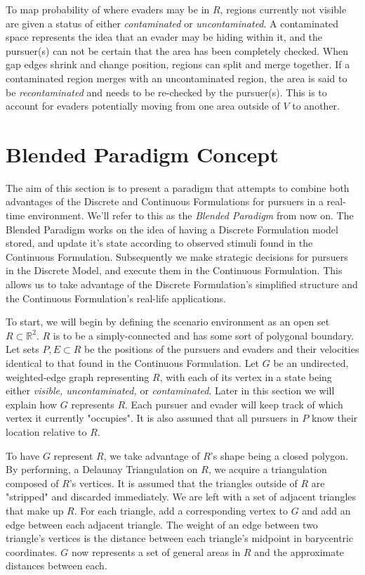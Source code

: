 \documentclass{article}
\begin{document}
To map probability of where evaders may be in \(R\), regions currently not visible are given a status of either \emph{contaminated} or \emph{uncontaminated}. A contaminated space represents the idea that an evader may be hiding within it, and the pursuer(s) can not be certain that the area has been completely checked. When gap edges shrink and change position, regions can split and merge together. If a contaminated region merges with an uncontaminated region, the area is said to be \emph{recontaminated} and needs to be re-checked by the pursuer(s). This is to account for evaders potentially moving from one area outside of \(V\) to another.

\section{Blended Paradigm Concept}
The aim of this section is to present a paradigm that attempts to combine both advantages of the Discrete and Continuous Formulations for pursuers in a real-time environment. We'll refer to this as the \emph{Blended Paradigm} from now on. The Blended Paradigm works on the idea of having a Discrete Formulation model stored, and update it's state according to observed stimuli found in the Continuous Formulation. Subsequently we make strategic decisions for pursuers in the Discrete Model, and execute them in the Continuous Formulation. This allows us to take advantage of the Discrete Formulation's simplified structure and the Continuous Formulation's real-life applications.

To start, we will begin by defining the scenario environment as an open set \(R\subset\mathbb{R}^2\). \(R\) is to be a simply-connected and has some sort of polygonal boundary. Let sets \(P,E\subset{R}\) be the positions of the pursuers and evaders and their velocities identical to that found in the Continuous Formulation. Let \(G\) be an undirected, weighted-edge graph representing \(R\), with each of its vertex in a state being either \emph{visible, uncontaminated,} or \emph{contaminated}. Later in this section we will explain how \(G\) represents \(R\). Each pursuer and evader will keep track of which vertex it currently "occupies". It is also assumed that all pursuers in \(P\) know their location relative to \(R\).

To have \(G\) represent \(R\), we take advantage of \(R\)'s shape being a closed polygon. By performing, a Delaunay Triangulation on \(R\), we acquire a triangulation composed of \(R\)'s vertices. \cite{dTri} It is assumed that the triangles outside of \(R\) are "stripped" and discarded immediately. We are left with a set of adjacent triangles that make up \(R\). For each triangle, add a corresponding vertex to \(G\) and add an edge between each adjacent triangle. The weight of an edge between two triangle's vertices is the distance between each triangle's midpoint in barycentric coordinates. \cite{bCenter} \(G\) now represents a set of general areas in \(R\) and the approximate distances between each.
\end{document}
